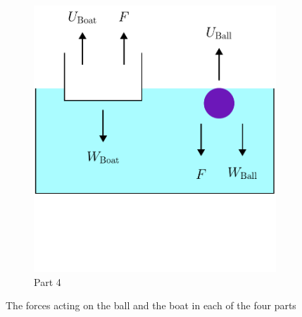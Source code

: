 \begin{figure}[H]
\begin{subfigure}{0.49\textwidth}
        \includegraphics[width=\textwidth]{5 - Physics/TheBallAndTheBoat_Case4.pdf}
        \caption{Part 4}
        \label{fig:TheBallAndTheBoat_Case4}
    \end{subfigure}
    \caption{The forces acting on the ball and the boat in each of the four parts}
    \label{fig:TheBallAndTheBoat}
\end{figure}